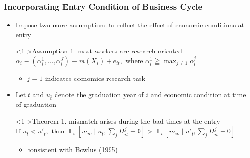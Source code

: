 \documentclass[11pt]{beamer}
\begin{document}
\begin{frame}
	\frametitle{Incorporating Entry Condition of Business Cycle}
	\begin{itemize}
		\item Impose two more assumptions to reflect the effect of economic conditions at entry
		\begin{block}<1->{Assumption 1. most workers are research-oriented}
			$\alpha_{i}\equiv \left( \alpha_{i}^1,...,\alpha_{i}^J\right) \equiv m(X_i)+e_{it}, \text{ where }  \alpha_{i}^1 \geqq \max_{j\ne 1} \alpha_{i}^j $  
		\end{block}
	\begin{itemize}
		\item $j=1$ indicates economics-research task 
	\end{itemize}
\vspace{1 mm}
        \item Let $\bar{t}$ and $u_{\bar{t}}$  denote the graduation year of $i$ and economic condition at time of graduation 
		\begin{block}<1->{Theorem 1. mismatch arises during the bad times at the entry}
		$\text{If } u_{\bar{t}}< u'_{\bar{t}},\text{ then }\mathop{{}\mathbb{E}}_{i}\left[ m_{io} \mid u_{\bar{t}}, \sum_{j} H_{it}^{j} = 0 \right] > \mathop{{}\mathbb{E}}_{i}\left[ m_{io} \mid u'_{\bar{t}}, \sum_{j} H_{it}^{j} = 0 \right]$
		\end{block}
		\begin{itemize}
			\item consistent with Bowlus (1995)
		\end{itemize}
	\end{itemize}
\end{frame}
\end{document}
